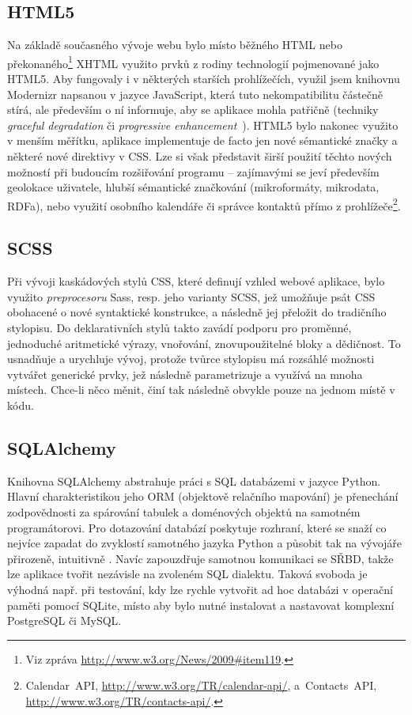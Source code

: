 \documentclass[12pt,oneside,final]{fithesis2}
\begin{document}
\subsection{HTML5}
Na základě současného vývoje webu bylo místo běžného HTML nebo překonaného\footnote{Viz zpráva \url{http://www.w3.org/News/2009\#item119}.} XHTML využito prvků z rodiny technologií pojmenované jako HTML5. Aby fungovaly i v některých starších prohlížečích, využil jsem knihovnu Modernizr napsanou v jazyce JavaScript, která tuto nekompatibilitu částečně stírá, ale především o ní informuje, aby se aplikace mohla patřičně  (techniky \emph{graceful degradation} či \emph{progressive enhancement}~\cite{heilmann2009graceful}). HTML5 bylo nakonec využito v menším měřítku, aplikace implementuje de facto jen nové sémantické značky a některé nové direktivy v CSS. Lze si však představit širší použití těchto nových možností při budoucím rozšiřování programu -- zajímavými se jeví především geolokace uživatele, hlubší sémantické značkování (mikroformáty, mikrodata, RDFa), nebo využití osobního kalendáře či správce kontaktů přímo z prohlížeče\footnote{Calendar~API, \url{http://www.w3.org/TR/calendar-api/}, a~Contacts~API, \url{http://www.w3.org/TR/contacts-api/}.}.

\subsection{SCSS}
Při vývoji kaskádových stylů CSS, které definují vzhled webové aplikace, bylo využito \emph{preprocesoru} Sass, resp. jeho varianty SCSS, jež umožňuje psát CSS obohacené o nové syntaktické konstrukce, a následně jej přeložit do tradičního stylopisu. Do deklarativních stylů takto zavádí podporu pro proměnné, jednoduché aritmetické výrazy, vnořování, znovupoužitelné bloky a dědičnost. To usnadňuje a urychluje vývoj, protože tvůrce stylopisu má rozsáhlé možnosti vytvářet generické prvky, jež následně parametrizuje a využívá na mnoha místech. Chce-li něco měnit, činí tak následně obvykle pouze na jednom místě v kódu.

\subsection{SQLAlchemy}
Knihovna SQLAlchemy abstrahuje práci s SQL databázemi v jazyce Python. Hlavní charakteristikou jeho ORM (objektově relačního mapování) je přenechání zodpovědnosti za spárování tabulek a doménových objektů na samotném programátorovi. Pro dotazování databází poskytuje rozhraní, které se snaží co nejvíce zapadat do zvyklostí samotného jazyka Python a působit tak na vývojáře přirozeně, intuitivně \cite{copeland2008essential}. Navíc zapouzdřuje samotnou komunikaci se SŘBD, takže lze aplikace tvořit nezávisle na zvoleném SQL dialektu. Taková svoboda je výhodná např. při testování, kdy lze rychle vytvořit ad hoc databázi v operační paměti pomocí SQLite, místo aby bylo nutné instalovat a nastavovat komplexní PostgreSQL či MySQL.
\end{document}
